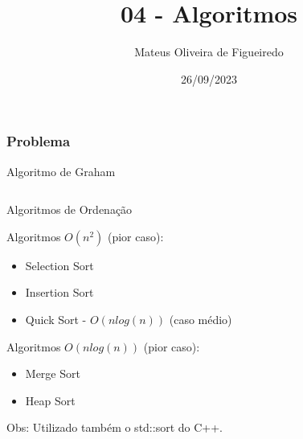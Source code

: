 \documentclass[aspectratio=169,usenames,dvipsnames]{beamer}
\title{04 - Algoritmos}
\author{Mateus Oliveira de Figueiredo}
\date{26/09/2023}
\begin{document}
\begin{frame}
\titlepage
\end{frame}

\begin{frame}
  \frametitle{Problema}

  \begin{figure}
    \begin{overprint}
    \end{overprint}
  \end{figure}
\end{frame}

\begin{frame}{Algoritmo de Graham}
  \begin{columns}
    \begin{column}{0.5\textwidth}
      \begin{itemize}
      \end{itemize}
    \end{column}
    \begin{column}{0.5\textwidth}
      
    \end{column}
  \end{columns}
  
\end{frame}

\begin{frame}{Algoritmos de Ordenação}

  \vfill

  Algoritmos $O(n^2)$ (pior caso):
  \begin{itemize}
    \item Selection Sort
    \item Insertion Sort
    \item Quick Sort - {\color{red} $O(n log(n))$ (caso médio)}
  \end{itemize}

  \vfill

  Algoritmos $O(n log(n))$ (pior caso):
  \begin{itemize}
    \item Merge Sort
    \item Heap Sort
  \end{itemize}

  \vfill

  Obs: Utilizado também o std::sort do C++.

  \vfill
  
\end{frame}
\end{document}
